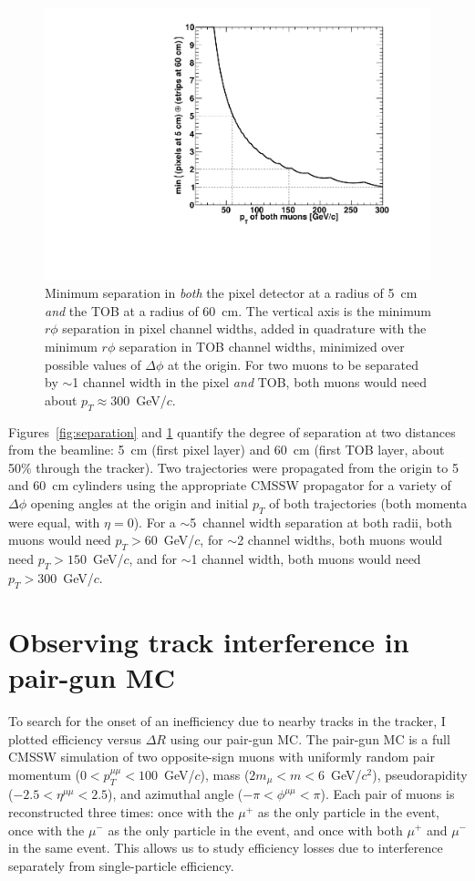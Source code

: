 \documentclass[12pt]{article}
\begin{document}
\begin{figure}[p]
\begin{center}
\includegraphics[width=0.5\linewidth]{separation_minimum.pdf}
\end{center}

\caption{Minimum separation in {\it both} the pixel detector at a
  radius of 5~cm {\it and} the TOB at a radius of 60~cm.  The vertical axis
  is the minimum $r\phi$ separation in pixel channel widths, added in
  quadrature with the minimum $r\phi$ separation in TOB channel
  widths, minimized over possible values of $\Delta \phi$ at the
  origin.  For two muons to be separated by $\sim$1 channel width in
  the pixel {\it and} TOB, both muons would need about $p_T \approx
  300$~GeV/$c$. \label{fig:separation2}}
\end{figure}

Figures~\ref{fig:separation} and \ref{fig:separation2} quantify the
degree of separation at two distances from the beamline: 5~cm (first
pixel layer) and 60~cm (first TOB layer, about 50\% through the
tracker).  Two trajectories were propagated from the origin to 5 and
60~cm cylinders using the appropriate CMSSW propagator for a variety
of $\Delta \phi$ opening angles at the origin and initial $p_T$ of
both trajectories (both momenta were equal, with $\eta = 0$).  For a
$\sim$5~channel width separation at both radii, both muons would need
$p_T > 60$~GeV/$c$, for $\sim$2 channel widths, both muons would need
$p_T > 150$~GeV/$c$, and for $\sim$1 channel width, both muons would
need $p_T > 300$~GeV/$c$.

\section{Observing track interference in pair-gun MC}

To search for the onset of an inefficiency due to nearby tracks in the
tracker, I plotted efficiency versus $\Delta R$ using our pair-gun MC.
The pair-gun MC is a full CMSSW simulation of two opposite-sign muons
with uniformly random pair momentum ($0 < p_T^{\mu\mu} <
100$~GeV/$c$), mass ($2m_\mu < m < 6$~GeV/$c^2$), pseudorapidity
($-2.5 < \eta^{\mu\mu} < 2.5$), and azimuthal angle ($-\pi <
\phi^{\mu\mu} < \pi$).  Each pair of muons is reconstructed three
times: once with the $\mu^+$ as the only particle in the event, once
with the $\mu^-$ as the only particle in the event, and once with both
$\mu^+$ and $\mu^-$ in the same event.  This allows us to study
efficiency losses due to interference separately from single-particle
efficiency.
\end{document}
